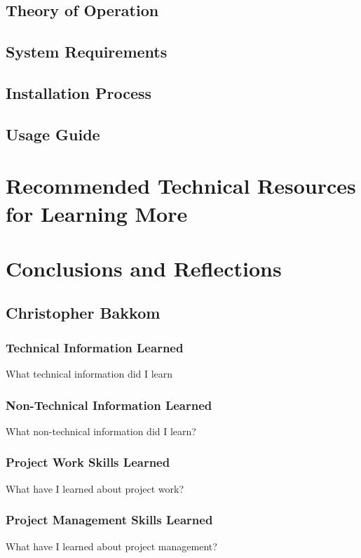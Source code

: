 \documentclass[onecolumn, draftclsnofoot,10pt, compsoc]{IEEEtran}
\begin{document}
\subsection{Theory of Operation}



\subsection{System Requirements}


\subsection{Installation Process}


\subsection{Usage Guide}



\section{Recommended Technical Resources for Learning More}




\section{Conclusions and Reflections}


\subsection{Christopher Bakkom}

\subsubsection{Technical Information Learned}
What technical information did I learn
\subsubsection{Non-Technical Information Learned}
What non-technical information did I learn?
\subsubsection{Project Work Skills Learned}
What have I learned about project work?
\subsubsection{Project Management Skills Learned}
What have I learned about project management?
\end{document}
